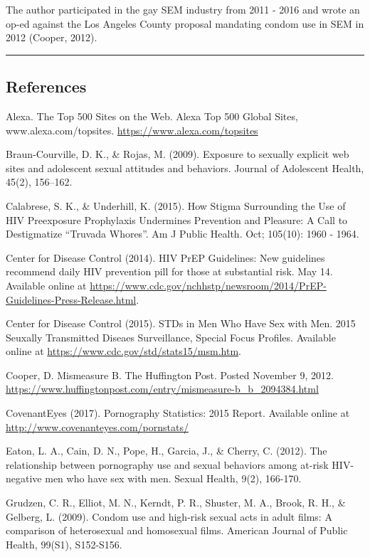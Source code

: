 \documentclass[]{article}
\begin{document}
The author participated in the gay SEM industry from 2011 - 2016 and
wrote an op-ed against the Los Angeles County proposal mandating condom
use in SEM in 2012 (Cooper, 2012).

\begin{center}\rule{0.5\linewidth}{\linethickness}\end{center}

\subsection{References}\label{references}

Alexa. The Top 500 Sites on the Web. Alexa Top 500 Global Sites,
www.alexa.com/topsites. \url{https://www.alexa.com/topsites}

Braun-Courville, D. K., \& Rojas, M. (2009). Exposure to sexually
explicit web sites and adolescent sexual attitudes and behaviors.
Journal of Adolescent Health, 45(2), 156--162.

Calabrese, S. K., \& Underhill, K. (2015). How Stigma Surrounding the
Use of HIV Preexposure Prophylaxis Undermines Prevention and Pleasure: A
Call to Destigmatize ``Truvada Whores''. Am J Public Health. Oct;
105(10): 1960 - 1964.

Center for Disease Control (2014). HIV PrEP Guidelines: New guidelines
recommend daily HIV prevention pill for those at substantial risk. May
14. Available online at
\url{https://www.cdc.gov/nchhstp/newsroom/2014/PrEP-Guidelines-Press-Release.html}.

Center for Disease Control (2015). STDs in Men Who Have Sex with Men.
2015 Seuxally Transmitted Diseaes Surveillance, Special Focus Profiles.
Available online at \url{https://www.cdc.gov/std/stats15/msm.htm}.

Cooper, D. Mismeasure B. The Huffington Post. Posted November 9, 2012.
\url{https://www.huffingtonpost.com/entry/mismeasure-b_b_2094384.html}

CovenantEyes (2017). Pornography Statistics: 2015 Report. Available
online at \url{http://www.covenanteyes.com/pornstats/}

Eaton, L. A., Cain, D. N., Pope, H., Garcia, J., \& Cherry, C. (2012).
The relationship between pornography use and sexual behaviors among
at-risk HIV-negative men who have sex with men. Sexual Health, 9(2),
166-170.

Grudzen, C. R., Elliot, M. N., Kerndt, P. R., Shuster, M. A., Brook, R.
H., \& Gelberg, L. (2009). Condom use and high-risk sexual acts in adult
films: A comparison of heterosexual and homosexual films. American
Journal of Public Health, 99(S1), S152-S156.
\end{document}
